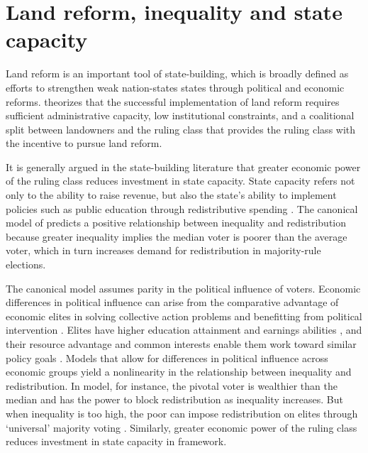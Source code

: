 \section{Land reform, inequality and state capacity}

Land reform is an important tool of state-building, which is broadly defined as efforts to strengthen weak nation-states states through political and economic reforms. \citet{albertus2015autocracy} theorizes that the successful implementation of land reform requires sufficient administrative capacity, low institutional constraints, and a coalitional split between landowners and the ruling class that provides the ruling class with the incentive to pursue land reform.

It is generally argued in the state-building literature that greater economic power of the ruling class reduces investment in state capacity. State capacity refers not only to the ability to raise revenue, but also the state’s ability to implement policies such as public education through redistributive spending \citep{besley2010state}. The canonical model of \citet{meltzer1981rational} predicts a positive relationship between inequality and redistribution because greater inequality implies the median voter is poorer than the average voter, which in turn increases demand for redistribution in majority-rule elections. 

The canonical model assumes parity in the political influence of voters. Economic differences in political influence can arise from the comparative advantage of economic elites in solving collective action problems and benefitting from political intervention \citep{acemoglu2008persistence}. Elites have higher education attainment and earnings abilities \citep{bourguignon2000oligarchy}, and their resource advantage and common interests enable them work toward similar policy goals \citep{winters2009}. Models that allow for differences in political influence across economic groups yield a nonlinearity in the relationship between inequality and redistribution. In  model, for instance, the pivotal voter is wealthier than the median and has the power to block redistribution as inequality increases. But when inequality is too high, the poor can impose redistribution on elites through `universal' majority voting \citep{perotti1993political,saint1993education}. Similarly, greater economic power of the ruling class reduces investment in state capacity in  framework. 

